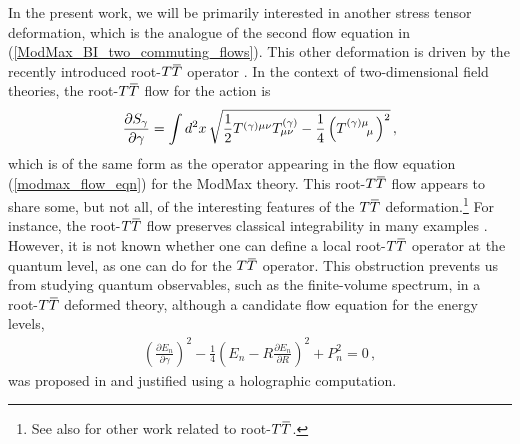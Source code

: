 \documentclass[12pt]{article}
\numberwithin{equation}{section}
\newcommand{\overbar}[1]{\mkern 1.5mu\overline{\mkern-1.5mu#1\mkern-1.5mu}\mkern 1.5mu}
\def\TT{{T\overbar{T}}}
\begin{document}
In the present work, we will be primarily interested in another stress tensor deformation, which is the analogue of the second flow equation in (\ref{ModMax_BI_two_commuting_flows}). This other deformation is driven by the recently introduced root-$\TT$ operator \cite{Ferko:2022cix}. In the context of two-dimensional field theories, the root-$\TT$ flow for the action is
%
\begin{align}\label{root_TT_action_flow}
    \frac{\partial S_\gamma}{\partial \gamma} = \int d^2 x \, \sqrt{ \frac{1}{2}  T^{(\gamma) \mu \nu} T_{\mu \nu}^{(\gamma)} - \frac{1}{4} \left( \tensor{T}{^{(\gamma)}^\mu_\mu} \right)^2 } \, , 
\end{align}
%
which is of the same form as the operator appearing in the flow equation (\ref{modmax_flow_eqn}) for the ModMax theory. This root-$\TT$ flow appears to share some, but not all, of the interesting features of the $\TT$ deformation.\footnote{See also \cite{Rodriguez:2021tcz,Bagchi:2022nvj,Tempo:2022ndz,Hou:2022csf,Ferko:2023sps} for other work related to root-$\TT$.} For instance, the root-$\TT$ flow preserves classical integrability in many examples \cite{Borsato:2022tmu}. However, it is not known whether one can define a local root-$\TT$ operator at the quantum level, as one can do for the $\TT$ operator. This obstruction prevents us from studying quantum observables, such as the finite-volume spectrum, in a root-$\TT$ deformed theory, although a candidate flow equation for the energy levels,
%
\begin{align}\label{root_TT_energy_flow}
    \left( \frac{\partial E_n}{\partial \gamma} \right)^2 - \frac{1}{4} \left( E_n - R \frac{\partial E_n}{\partial R} \right)^2 + P_n^2 = 0  \, ,
\end{align}
%
was proposed in \cite{Ebert:2023tih} and justified using a holographic computation.
\end{document}
